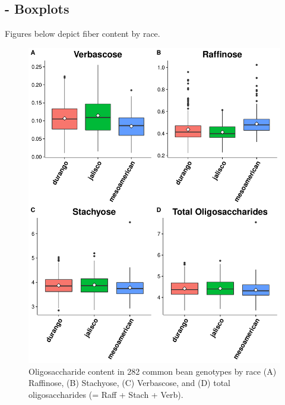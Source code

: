 \documentclass[11pt,]{article}
\makeatletter
\def\maxwidth{\ifdim\Gin@nat@width>\linewidth\linewidth
\else\Gin@nat@width\fi}
\let\Oldincludegraphics\includegraphics
\renewcommand{\includegraphics}[1]{\Oldincludegraphics[width=\maxwidth]{#1}}
\makeatother
\begin{document}
\subsection{- Boxplots}\label{boxplots-1}

Figures below depict fiber content by race.

\begin{figure}

{\centering \includegraphics{./manuscript_template_files/figure-latex/unnamed-chunk-14-1} 

}

\caption{Oligosaccharide content in 282 common bean genotypes by race (A) Raffinose, (B) Stachyose, (C) Verbascose, and (D) total oligosaccharides (= Raff + Stach + Verb).}\label{fig:unnamed-chunk-14}
\end{figure}
\end{document}
